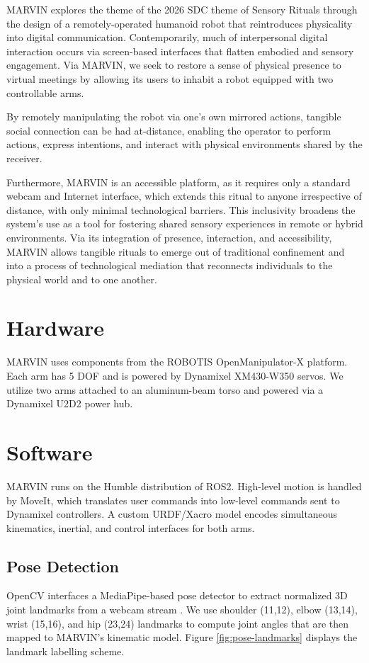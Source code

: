 \documentclass[acmsmall, screen]{acmart}
\begin{document}
MARVIN explores the theme of the 2026 SDC theme of Sensory Rituals through the design of a remotely-operated humanoid robot that reintroduces physicality into digital communication. Contemporarily, much of interpersonal digital interaction occurs via screen-based interfaces that flatten embodied and sensory engagement. Via MARVIN, we seek to restore a sense of physical presence to virtual meetings by allowing its users to inhabit a robot equipped with two controllable arms.

By remotely manipulating the robot via one's own mirrored actions, tangible social connection can be had at-distance, enabling the operator to perform actions, express intentions, and interact with physical environments shared by the receiver.

Furthermore, MARVIN is an accessible platform, as it requires only a standard webcam and Internet interface, which extends this ritual to anyone irrespective of distance, with only minimal technological barriers. This inclusivity broadens the system's use as a tool for fostering shared sensory experiences in remote or hybrid environments. Via its integration of presence, interaction, and accessibility, MARVIN allows tangible rituals to emerge out of traditional confinement and into a process of technological mediation that reconnects individuals to the physical world and to one another.

\section{Hardware}
MARVIN uses components from the ROBOTIS OpenManipulator-X platform. Each arm has 5 DOF and is powered by Dynamixel XM430-W350 servos. We utilize two arms attached to an aluminum-beam torso and powered via a Dynamixel U2D2 power hub.

\section{Software}
MARVIN runs on the Humble distribution of ROS2. High-level motion is handled by MoveIt, which translates user commands into low-level commands sent to Dynamixel controllers. A custom URDF/Xacro model encodes simultaneous kinematics, inertial, and control interfaces for both arms.

\subsection{Pose Detection}
OpenCV interfaces a MediaPipe-based pose detector to extract normalized 3D joint landmarks from a webcam stream \cite{noauthor_mediapipe_nodate}. We use shoulder (11,12), elbow (13,14), wrist (15,16), and hip (23,24) landmarks to compute joint angles that are then mapped to MARVIN's kinematic model. Figure \ref{fig:pose-landmarks} displays the landmark labelling scheme.
\end{document}
